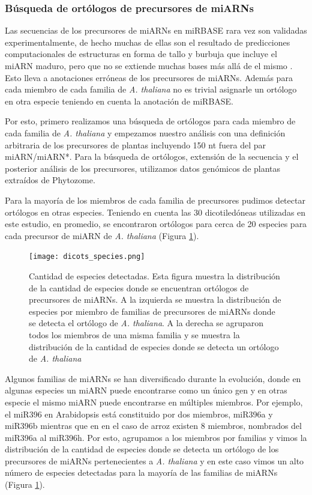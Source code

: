 \subsubsection{Búsqueda de ortólogos de precursores de miARNs}

Las secuencias de los precursores de miARNs en miRBASE rara vez son validadas experimentalmente, de hecho muchas de ellas son el resultado de predicciones computacionales de estructuras en forma de tallo y burbuja que incluye el miARN maduro, pero que no se extiende muchas bases más allá de el mismo \cite{Kozomara2014}.
Esto lleva a anotaciones erróneas de los precursores de miARNs.
Además para cada miembro de cada familia de \textit{A. thaliana} no es trivial asignarle un ortólogo en otra especie teniendo en cuenta la anotación de miRBASE.

Por esto, primero realizamos una búsqueda de ortólogos para cada miembro de cada familia de \textit{A. thaliana} y empezamos nuestro análisis con una definición arbitraria de los precursores de plantas incluyendo 150 nt fuera del par miARN/miARN*.
Para la búsqueda de ortólogos, extensión de la secuencia y el posterior análisis de los precursores, utilizamos datos genómicos de plantas extraídos de Phytozome. 

Para la mayoría de los miembros de cada familia de precursores pudimos detectar ortólogos en otras especies. 
Teniendo en cuenta las 30 dicotiledóneas utilizadas en este estudio, en promedio, se encontraron ortólogos para cerca de 20 especies para cada precursor de miARN de \textit{A. thaliana} (Figura \ref{fig:dicots_species}).

\begin{figure}[htbp!] 
    \centering    
    \texttt{[image: dicots\_species.png]}
    \caption[Especies detectadas]{Cantidad de especies detectadas.
    Esta figura muestra la distribución de la cantidad de especies donde se encuentran ortólogos de precursores de miARNs.
    A la izquierda se muestra la distribución de especies por miembro de familias de precursores de miARNs donde se detecta el ortólogo de \textit{A. thaliana}.
    A la derecha se agruparon todos los miembros de una misma familia y se muestra la distribución de la cantidad de especies donde se detecta un ortólogo de \textit{A. thaliana}}
    \label{fig:dicots_species}
\end{figure}

Algunos familias de miARNs se han diversificado durante la evolución, donde en algunas especies un miARN puede encontrarse como un único gen y en otras especie el mismo miARN puede encontrarse en múltiples miembros.
Por ejemplo, el miR396 en Arabidopsis está constituido por dos miembros, miR396a y miR396b mientras que en en el caso de arroz existen 8 miembros, nombrados del miR396a al miR396h.
Por esto, agrupamos a los miembros por familias y vimos la distribución de la cantidad de especies donde se detecta un ortólogo de los precursores de miARNs pertenecientes a \textit{A. thaliana} y en este caso vimos un alto número de especies detectadas para la mayoría de las familias de miARNs (Figura \ref{fig:dicots_species}).

